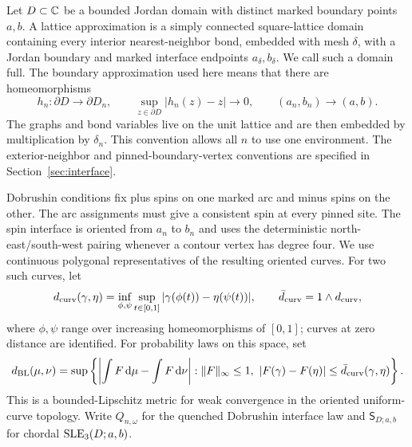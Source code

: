 Let $D\subset\mathbb C$ be a bounded Jordan domain with distinct marked boundary
points $a,b$. A lattice approximation is a simply connected square-lattice domain
containing every interior nearest-neighbor bond, embedded with mesh
$\delta$, with a Jordan boundary and marked interface endpoints
$a_\delta,b_\delta$. We call such a domain full. The boundary approximation used
here means that there are homeomorphisms
\begin{equation}\label{eq:boundary-approximation}
 h_n:\partial D\longrightarrow\partial D_n,
 \qquad \sup_{z\in\partial D}|h_n(z)-z|\longrightarrow0,
 \qquad (a_n,b_n)\longrightarrow(a,b).
\end{equation}
The graphs and bond variables live on the unit lattice and are then embedded
by multiplication by $\delta_n$. This convention allows all $n$ to use one
environment. The exterior-neighbor and pinned-boundary-vertex conventions are specified
in Section~\ref{sec:interface}.

Dobrushin conditions fix plus spins on one marked arc and minus spins on
the other. The arc assignments must give a consistent spin at every
pinned site. The spin interface is oriented from $a_n$ to $b_n$ and uses the
deterministic north-east/south-west pairing whenever a contour vertex has
degree four. We use continuous polygonal representatives of the resulting
oriented curves. For two such curves, let
\begin{equation}\label{eq:curve-metric}
 d_{\rm curv}(\gamma,\eta)
   =\inf_{\phi,\psi}\sup_{t\in[0,1]}
          |\gamma(\phi(t))-\eta(\psi(t))|,
 \qquad \bar d_{\rm curv}=1\wedge d_{\rm curv},
\end{equation}
where $\phi,\psi$ range over increasing homeomorphisms of $[0,1]$; curves
at zero distance are identified. For probability laws on this space, set
\begin{equation}\label{eq:BL-definition}
 d_{\rm BL}(\mu,\nu)
 =\sup\left\{\left|\int F\,\dd\mu-\int F\,\dd\nu\right|:
       \|F\|_\infty\leq1,\ 
       |F(\gamma)-F(\eta)|\leq\bar d_{\rm curv}(\gamma,\eta)\right\}.
\end{equation}
This is a bounded-Lipschitz metric for weak convergence in the oriented
uniform-curve topology. Write $Q_{n,\omega}$ for the quenched Dobrushin
interface law and $\mathsf S_{D;a,b}$ for chordal $\operatorname{SLE}_3(D;a,b)$.

